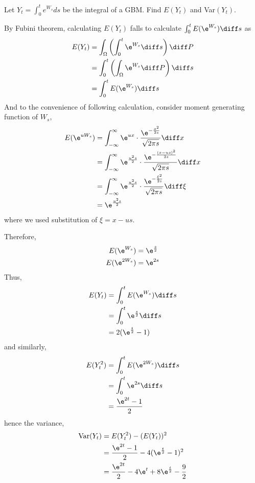     \problem
    \begin{question}
        Let $Y_t=\int_0^t e^{W_s}ds$ be the integral of a GBM.
        Find $E(Y_t)$ and Var$(Y_t)$.
    \end{question}
    By Fubini theorem, calculating $E(Y_t)$ falls to
    calculate $\int_0^tE(\e^{W_s})\diff s$ as
    \[\begin{aligned}
    E(Y_t)&=\int_\Omega\left(\int_0^t\e^{W_s}\diff s\right)\diff P\\
    &=\int_0^t\left(\int_\Omega\e^{W_s}\diff P\right)\diff s\\
    &=\int_0^tE(\e^{W_s})\diff s \\
    \end{aligned}\]
    And to the convenience of following calculation, consider moment
    generating function of $W_s$,
    \begin{equation}
        \label{eq:mgf h4}
        \begin{aligned}
        E(\e^{uW_s})&=\int_{-\infty}^\infty\e^{ux}\cdot
        \frac{\e^{-\frac{x^2}{2s}}}{\sqrt{2\pi s}}\diff x\\
        &=\int_{-\infty}^\infty\e^{\frac{u^2s}{2}}
        \cdot\frac{\e^{-\frac{(x-us)^2}{2s}}}{\sqrt{2\pi s}}\diff x\\
        &=\int_{-\infty}^\infty\e^{\frac{u^2s}{2}}
        \cdot\frac{\e^{-\frac{\xi^2}{2s}}}{\sqrt{2\pi s}}\diff\xi\\
        &=\e^{\frac{u^2s}{2}}
        \end{aligned}
    \end{equation}
    where we used substitution of $\xi=x-us$.

    Therefore,
    \[\begin{aligned}
        E(\e^{W_s})&=\e^{\frac{s}{2}}\\
        E(\e^{2W_s})&=\e^{2s}\\
    \end{aligned}\]
    Thus,
    \[\begin{aligned}
        E(Y_t)&=\int_0^tE(\e^{W_s})\diff s\\
        &=\int_0^t\e^{\frac{s}{2}}\diff s\\
        &=2(\e^{\frac{t}{2}}-1)
    \end{aligned}\]
    and similarly,
    \[\begin{aligned}
        E(Y_t^2)&=\int_0^tE(\e^{2W_s})\diff s\\
        &=\int_0^t\e^{2s}\diff s\\
        &=\frac{\e^{2t}-1}{2}
    \end{aligned}\]
    hence the variance,
    \[\begin{aligned}
        \var(Y_t)&=E(Y_t^2)-(E(Y_t))^2\\
        &=\frac{\e^{2t}-1}{2}-4(\e^{\frac{t}{2}}-1)^2\\
        &=\frac{\e^{2t}}{2}-4\e^t+8\e^{\frac{t}{2}}-\frac{9}{2}
    \end{aligned}\]

